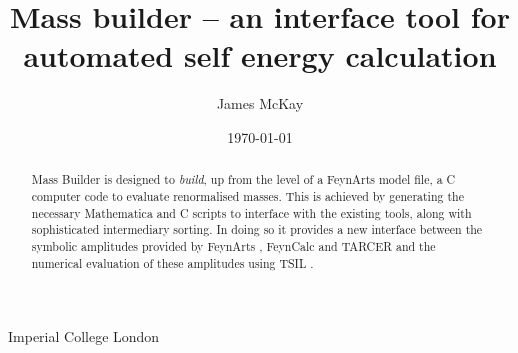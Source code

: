 



\def\A{\mathcal{A}}
\def\B{\mathcal{B}}
\def\C{\mathcal{C}}

\newcommand{\mb}{\textsf{Mass Builder} }
\newcommand{\mbs}{\textsf{Mass Builder}}
\newcommand{\tsil}{\textsf{TSIL} }
\newcommand{\tsils}{\textsf{TSIL}}
\newcommand{\tarcer}{\textsf{TARCER} }
\newcommand{\tarcers}{\textsf{TARCER}}
\newcommand{\sarah}{\textsf{SARAH} }
\newcommand{\sarahs}{\textsf{SARAH}}
\newcommand{\feynarts}{\textsf{FeynArts} }
\newcommand{\feynartss}{\textsf{FeynArts}}
\newcommand{\feyncalc}{\textsf{FeynCalc} }
\newcommand{\feyncalcs}{\textsf{FeynCalc}}
\newcommand{\cmake}{\textsf{cmake} }

\newcommand{\mathematica}{\textsf{Mathematica} }



\newcommand{\CC}{C\nolinebreak\hspace{-.05em}\raisebox{.4ex}{\tiny\bf +}\nolinebreak\hspace{-.10em}\raisebox{.4ex}{\tiny\bf +} }

\graphicspath{ {Figures/}}

\title{Mass builder -- an interface tool for automated self energy calculation}
%
\author
{
  James McKay
}
%
%
\institute
{
  Imperial College London\label{addr1}
}
%
\date{\today}

\maketitle

\begin{abstract}

\mb is designed to \textit{build}, up from the level of a \feynarts model file, a \CC computer code to evaluate renormalised masses.  This is achieved by generating the necessary \mathematica and \CC scripts to interface with the existing tools, along with sophisticated intermediary sorting.  In doing so it provides a new interface between the symbolic amplitudes provided by \feynarts \cite{Hahn2000}, \feyncalc \cite{Mertig1991,Shtabovenko2016} and \tarcer \cite{Mertig1998} and the numerical evaluation of these amplitudes using \tsil \cite{Martin2006}.  

\end{abstract}

\tableofcontents



